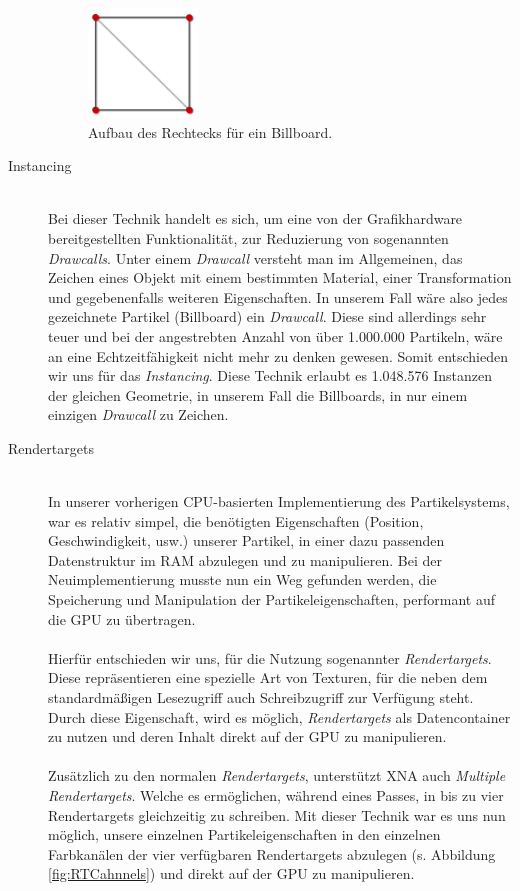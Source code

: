 \begin{Spacing}{\mylinespace}
\begin{description}
\begin{figure}[h!]
	\centering
	\vspace*{30px}
	\includegraphics[width=110px]{graphics/billboardQuad.png}
	\caption{Aufbau des Rechtecks für ein Billboard.}
	\label{fig:BBQuad}
\end{figure}
\newpage
	\item[Instancing] \hfill \\
	Bei dieser Technik handelt es sich, um eine von der Grafikhardware bereitgestellten Funktionalität, zur Reduzierung von sogenannten \textit{Drawcalls}. Unter einem \textit{Drawcall} versteht man im Allgemeinen, das Zeichen eines Objekt mit einem bestimmten Material, einer Transformation und gegebenenfalls weiteren Eigenschaften. In unserem Fall wäre also jedes gezeichnete Partikel (Billboard) ein \textit{Drawcall}. Diese sind allerdings sehr teuer und bei der angestrebten Anzahl von über 1.000.000 Partikeln, wäre an eine Echtzeitfähigkeit nicht mehr zu denken gewesen. Somit entschieden wir uns für das \textit{Instancing}. Diese Technik erlaubt es 1.048.576 Instanzen der gleichen Geometrie, in unserem Fall die Billboards, in nur einem einzigen \textit{Drawcall} zu Zeichen. 
	
	\item[Rendertargets] \hfill \\
	In unserer vorherigen CPU-basierten Implementierung des Partikelsystems, war es relativ simpel, die benötigten Eigenschaften (Position, Geschwindigkeit, usw.) unserer Partikel, in einer dazu passenden Datenstruktur im RAM abzulegen und zu manipulieren. Bei der Neuimplementierung musste nun ein Weg gefunden werden, die Speicherung und Manipulation der Partikeleigenschaften, performant auf die GPU zu übertragen.
\\\\
Hierfür entschieden wir uns, für die Nutzung sogenannter \textit{Rendertargets}.   Diese repräsentieren eine spezielle Art von Texturen, für die neben dem standardmäßigen Lesezugriff auch Schreibzugriff zur Verfügung steht. Durch diese Eigenschaft, wird es möglich, \textit{Rendertargets} als Datencontainer zu nutzen und deren Inhalt direkt auf der GPU zu manipulieren.
\\\\
Zusätzlich zu den normalen \textit{Rendertargets}, unterstützt XNA auch \textit{Multiple Rendertargets}. Welche es ermöglichen, während eines Passes, in bis zu vier Rendertargets gleichzeitig zu schreiben. Mit dieser Technik war es uns nun möglich, unsere einzelnen Partikeleigenschaften in den einzelnen Farbkanälen der vier verfügbaren Rendertargets abzulegen (s. Abbildung \ref{fig:RTCahnnels}) und direkt auf der GPU zu manipulieren. 
	

\end{description}
\end{Spacing}
